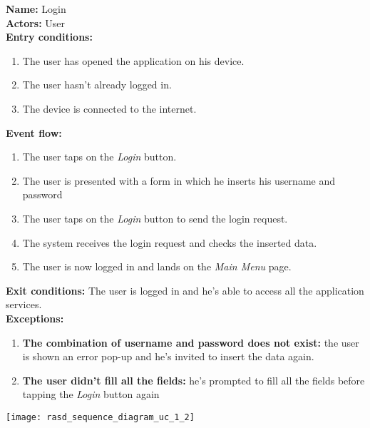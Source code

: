 \begin{usecase}{1.2}
\label{uc:1.2}
\textbf{Name:} Login\\
\textbf{Actors:} User\\
\textbf{Entry conditions:}
\begin{enumerate}
    \item The user has opened the application on his device.
    \item The user hasn't already logged in.
    \item The device is connected to the internet.    
\end{enumerate}
\textbf{Event flow:}
\begin{enumerate}
    \item The user taps on the \emph{Login} button.
    \item The user is presented with a form in which he inserts his username and
    password
    \item The user taps on the \emph{Login} button to send the login request.
    \item The system receives the login request and checks the inserted
    data.
    \item The user is now logged in and lands on the \emph{Main Menu} page.
\end{enumerate}
\textbf{Exit conditions: } The user is logged in and he's able to access all the
application services. \\
\textbf{Exceptions:}
\begin{enumerate}
    \item \textbf{The combination of username and password does not exist:} the
    user is shown an error pop-up and he's invited to insert the data again.
    \item \textbf{The user didn't fill all the fields:} he's prompted to fill
    all the fields before tapping the \emph{Login} button again
\end{enumerate}
\tcblower
\centering
\texttt{[image: rasd\_sequence\_diagram\_uc\_1\_2]}
\end{usecase}